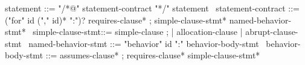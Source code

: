 \begin{syntax}
  statement ::= "/*@" statement-contract "*/" statement
  \
  statement-contract ::= ("for" id ("," id)* ":")? requires-clause* ;
    simple-clause-stmt* named-behavior-stmt*
  \
  simple-clause-stmt::= simple-clause ;
                      | allocation-clause | abrupt-clause-stmt
  \
  named-behavior-stmt ::= "behavior" id ":" behavior-body-stmt
  \
  behavior-body-stmt ::= assumes-clause* ;
       requires-clause* simple-clause-stmt*
\end{syntax}
